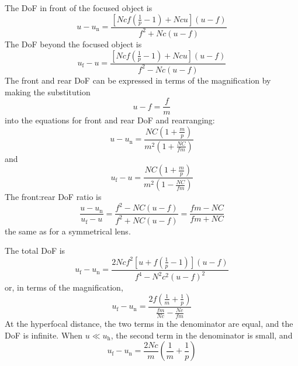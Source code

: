 \documentclass[11pt, oneside]{scrartcl}   	%
\begin{document}
The DoF in front of the focused object is
\begin{equation}
  \label{eq:98}
  u-u_\mathrm{n}=\frac{\left[N\!cf\left(\frac 1p-1\right) + N\!cu\right](u-f)}{f^2
    + N\!c(u-f)}
\end{equation}
The DoF beyond the focused object is
\begin{equation}
u_\mathrm{f}-u=\frac{\left[N\!cf\left(\frac 1 p -1\right) + N\!cu\right](u-f)}{f^2-N\!c(u-f)}
   \label{eq:dofbfo}
\end{equation}
The front and rear DoF can be expressed in terms of the magnification by making the substitution
\begin{equation}
u-f = \frac f m
\end{equation}
 into the equations for front and rear DoF and rearranging:
\begin{equation}
u-u_\mathrm{n} = \frac{NC\left(1+ \frac m p\right)}{m^2\left(1+\frac{NC}{fm}\right)}
\end{equation}
and
\begin{equation}
u_\mathrm{f}-u = \frac{NC\left(1+ \frac m p\right)}{m^2\left(1-\frac{NC}{fm}\right)}
\end{equation}
The front:rear DoF ratio is 
\begin{equation}
   \frac{u - u_\mathrm{n}}{u_\mathrm{f}-u} =  \frac{f^2 - NC(u-f)}{f^2 + NC(u-f)} = \frac{fm - NC}{fm + NC}
   \label{eq:frdofratio}
\end{equation}
the same as for a symmetrical lens.

The total DoF is
\begin{equation}
   u_\mathrm{f} - u_\mathrm{n} = \frac{2N\!cf^2\left[u+f\left(\frac 1 p -1 \right)\right](u-f)}{f^4-N^2c^2(u-f)^2}
   \label{eq:totdof}
\end{equation}
or, in terms of the magnification,
\begin{equation}
   u_\mathrm{f} - u_\mathrm{n} = \frac{2f\left(\frac 1 m + \frac 1 p\right)}{\frac{fm}{N\!c}-\frac{N\!c}{fm}}
   \label{eq:magdof}
\end{equation}
At the hyperfocal distance, the two terms in the denominator are equal, and the DoF is
 infinite. When $u\ll u_\mathrm{h}$, the second term in the denominator is small, and
\begin{equation}
   u_\mathrm{f} - u_\mathrm{n} = \frac{2N\!c}{m}\left(\frac 1 m + \frac 1 p\right)
   \label{eq:DOFapprox}
\end{equation}
\end{document}
